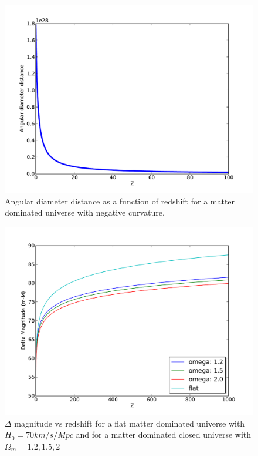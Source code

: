 \documentclass[a4paper,11pt]{article}
\begin{document}
\begin{figure}[h!]
\begin{center}
\includegraphics[scale=.6]{plot_1.pdf}
\caption{Angular diameter distance as a function of redshift for a matter dominated universe with negative curvature.}
\end{center}
\end{figure}

\begin{figure}[h!]
\begin{center}
\includegraphics[scale=.6]{plot_2.pdf}
\caption{$\Delta$ magnitude vs redshift for a flat matter dominated universe with $H_0=70km/s/Mpc$ and for a matter dominated closed universe with $\Omega_m=1.2,1.5,2$}
\end{center}
\end{figure}
\end{document}
